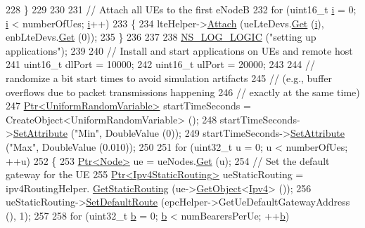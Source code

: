 \begin{DoxyCode}
228     \}
229 
230 
231   \textcolor{comment}{// Attach all UEs to the first eNodeB}
232   \textcolor{keywordflow}{for} (uint16\_t \hyperlink{bernuolliDistribution_8m_a6f6ccfcf58b31cb6412107d9d5281426}{i} = 0; \hyperlink{bernuolliDistribution_8m_a6f6ccfcf58b31cb6412107d9d5281426}{i} < numberOfUes; \hyperlink{bernuolliDistribution_8m_a6f6ccfcf58b31cb6412107d9d5281426}{i}++)
233     \{
234       lteHelper->\hyperlink{classns3_1_1LteHelper_a9466743f826aa2652a87907b7f0a1c87}{Attach} (ueLteDevs.\hyperlink{classns3_1_1NetDeviceContainer_a677d62594b5c9d2dea155cc5045f4d0b}{Get} (\hyperlink{bernuolliDistribution_8m_a6f6ccfcf58b31cb6412107d9d5281426}{i}), enbLteDevs.\hyperlink{classns3_1_1NetDeviceContainer_a677d62594b5c9d2dea155cc5045f4d0b}{Get} (0));
235     \}
236 
237 
238   \hyperlink{group__logging_ga88acd260151caf2db9c0fc84997f45ce}{NS\_LOG\_LOGIC} (\textcolor{stringliteral}{"setting up applications"});
239 
240   \textcolor{comment}{// Install and start applications on UEs and remote host}
241   uint16\_t dlPort = 10000;
242   uint16\_t ulPort = 20000;
243 
244   \textcolor{comment}{// randomize a bit start times to avoid simulation artifacts}
245   \textcolor{comment}{// (e.g., buffer overflows due to packet transmissions happening}
246   \textcolor{comment}{// exactly at the same time)}
247   \hyperlink{classns3_1_1Ptr}{Ptr<UniformRandomVariable>} startTimeSeconds = 
      CreateObject<UniformRandomVariable> ();
248   startTimeSeconds->\hyperlink{classns3_1_1ObjectBase_ac60245d3ea4123bbc9b1d391f1f6592f}{SetAttribute} (\textcolor{stringliteral}{"Min"}, DoubleValue (0));
249   startTimeSeconds->\hyperlink{classns3_1_1ObjectBase_ac60245d3ea4123bbc9b1d391f1f6592f}{SetAttribute} (\textcolor{stringliteral}{"Max"}, DoubleValue (0.010));
250 
251   \textcolor{keywordflow}{for} (uint32\_t u = 0; u < numberOfUes; ++u)
252     \{
253       \hyperlink{classns3_1_1Ptr}{Ptr<Node>} ue = ueNodes.\hyperlink{classns3_1_1NodeContainer_a9ed96e2ecc22e0f5a3d4842eb9bf90bf}{Get} (u);
254       \textcolor{comment}{// Set the default gateway for the UE}
255       \hyperlink{classns3_1_1Ptr}{Ptr<Ipv4StaticRouting>} ueStaticRouting = ipv4RoutingHelper.
      \hyperlink{classns3_1_1Ipv4StaticRoutingHelper_a731206e50d305695dac7fb2ef963a4bb}{GetStaticRouting} (ue->\hyperlink{classns3_1_1Object_a13e18c00017096c8381eb651d5bd0783}{GetObject}<\hyperlink{classns3_1_1Ipv4}{Ipv4}> ());
256       ueStaticRouting->\hyperlink{classns3_1_1Ipv4StaticRouting_aee30fa3246c2b42f122dabdff2725331}{SetDefaultRoute} (epcHelper->GetUeDefaultGatewayAddress (), 1);
257 
258       \textcolor{keywordflow}{for} (uint32\_t \hyperlink{buildings__pathloss_8m_a21ad0bd836b90d08f4cf640b4c298e7c}{b} = 0; \hyperlink{buildings__pathloss_8m_a21ad0bd836b90d08f4cf640b4c298e7c}{b} < numBearersPerUe; ++\hyperlink{buildings__pathloss_8m_a21ad0bd836b90d08f4cf640b4c298e7c}{b})

\end{DoxyCode}
